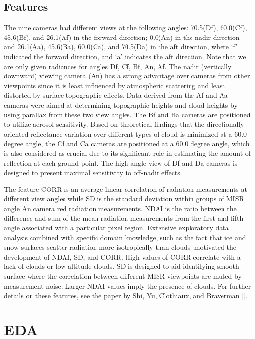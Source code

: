 \documentclass{article}\usepackage[]{graphicx}\usepackage[]{color}
\begin{document}
\subsection{Features} The nine cameras had different views at the following angles: 70.5\textdegree (Df), 60.0\textdegree (Cf), 45.6\textdegree (Bf), and 26.1\textdegree (Af) in the forward direction; 0.0\textdegree (An) in the nadir direction and 26.1\textdegree (Aa), 45.6\textdegree (Ba), 60.0\textdegree (Ca), and 70.5\textdegree (Da) in the aft direction, where `f' indicated the forward direction, and `a' indicates the aft direction. Note that we are only given radiances for angles Df, Cf, Bf, An, Af. The nadir (vertically downward) viewing camera (An) has a strong advantage over cameras from other viewpoints since it is least influenced by atmospheric scattering and least distorted by surface topographic effects. Data derived from the Af and Aa cameras were aimed at determining topographic heights and cloud heights by using parallax from these two view angles. The Bf and Ba cameras are positioned to utilize aerosol sensitivity. Based on theoretical findings that the directionally-oriented reflectance variation over different types of cloud is minimized at a 60.0 degree angle, the Cf and Ca cameras are positioned at a 60.0 degree angle, which is also considered as crucial due to its significant role in estimating the amount of reflection at each ground point. The high angle view of Df and Da cameras is designed to present maximal sensitivity to off-nadir effects. 

The feature CORR is an average linear correlation of radiation measurements at different view angles while SD is the standard deviation within groups of MISR angle An camera red radiation measurements. NDAI is the ratio between the difference and sum of the mean radiation measurements from the first and fifth angle associated with a particular pixel region. Extensive exploratory data analysis combined with specific domain knowledge, such as the fact that ice and snow surfaces scatter radiation more isotropically than clouds, motivated the development of NDAI, SD, and CORR. High values of CORR correlate with a lack of clouds or low altitude clouds. SD is designed to aid identifying smooth surface where the correlation between different MISR viewpoints are muted by measurement noise. Larger NDAI values imply the presence of clouds. For further details on these features, see the paper by Shi, Yu, Clothiaux, and Braverman [].

\section{EDA}
\end{document}
